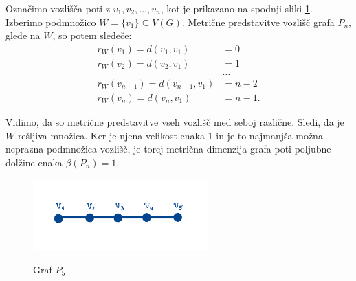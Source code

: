 \documentclass[mat1, tisk]{fmfdelo}
\begin{document}
\begin{primer} \label{pr:mdim_pot}
Označimo vozlišča poti z $v_1, v_2, ..., v_n$, kot je prikazano na spodnji sliki \ref{fig:pot}. 
Izberimo podmnožico $W = \{v_1\} \subseteq V(G).$ Metrične predstavitve vozlišč grafa $P_n$, 
glede na $W$, so potem sledeče:
\begin{align*}
    r_W(v_1) = d(v_1, v_1) & = 0 \\
    r_W(v_2) = d(v_2, v_1) & = 1 \\
    & \dots \\
    r_W(v_{n-1}) = d(v_{n-1}, v_1) & = n-2 \\
    r_W(v_n) = d(v_n, v_1) & = n-1.
\end{align*}

Vidimo, da so metrične predstavitve vseh vozlišč med seboj različne. Sledi, da je $W$ 
rešljiva množica. Ker je njena velikost enaka $1$ in je to najmanjša možna neprazna podmnožica 
vozlišč, je torej metrična dimenzija grafa poti poljubne dolžine enaka $\beta(P_n) = 1.$

\begin{figure}[h]
    \caption{Graf $P_5$}
    \centering
    \includegraphics[width=0.6\textwidth]{IMG_pot.jpg}
    \label{fig:pot}      
\end{figure}

\end{primer}
\end{document}
